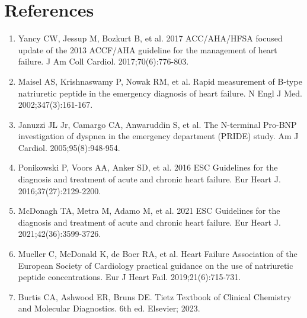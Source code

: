 \section*{References}
\begin{enumerate}
  \item Yancy CW, Jessup M, Bozkurt B, et al. 2017 ACC/AHA/HFSA focused update of the 2013 ACCF/AHA guideline for the management of heart failure. J Am Coll Cardiol. 2017;70(6):776-803.
  \item Maisel AS, Krishnaswamy P, Nowak RM, et al. Rapid measurement of B-type natriuretic peptide in the emergency diagnosis of heart failure. N Engl J Med. 2002;347(3):161-167.
  \item Januzzi JL Jr, Camargo CA, Anwaruddin S, et al. The N-terminal Pro-BNP investigation of dyspnea in the emergency department (PRIDE) study. Am J Cardiol. 2005;95(8):948-954.
  \item Ponikowski P, Voors AA, Anker SD, et al. 2016 ESC Guidelines for the diagnosis and treatment of acute and chronic heart failure. Eur Heart J. 2016;37(27):2129-2200.
  \item McDonagh TA, Metra M, Adamo M, et al. 2021 ESC Guidelines for the diagnosis and treatment of acute and chronic heart failure. Eur Heart J. 2021;42(36):3599-3726.
  \item Mueller C, McDonald K, de Boer RA, et al. Heart Failure Association of the European Society of Cardiology practical guidance on the use of natriuretic peptide concentrations. Eur J Heart Fail. 2019;21(6):715-731.
  \item Burtis CA, Ashwood ER, Bruns DE. Tietz Textbook of Clinical Chemistry and Molecular Diagnostics. 6th ed. Elsevier; 2023.
\end{enumerate}

\clearpage
